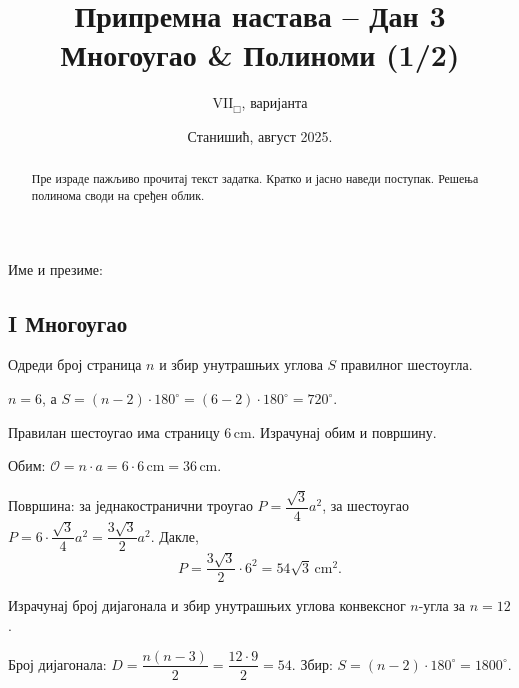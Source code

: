 \documentclass[10pt,a5paper,addpoints]{exam}
\title{Припремна настава – Дан 3\\ \small Многоугао \& Полиноми (1/2)}
\author{$\mathrm{VII}_\Box$, варијанта \variant{1}{2}{3}}
\date{Станишић, август 2025.}
\newcommand{\measure}[2]{#1\,\mathrm{#2}}
\def\variant#1#2#3{#1}
\begin{document}
\maketitle
\thispagestyle{headandfoot}

\noindent Име и презиме:\enspace\underline{\makebox[0.45\textwidth][s]{\hfill}}

\begin{flushleft}
\gradetable[h]
\end{flushleft}

\begin{abstract}
Пре израде пажљиво прочитај текст задатка. Кратко и јасно наведи поступак. Решења полинома своди на сређен облик.
\end{abstract}

\begin{questions}

\section*{I Многоугао}

\question[3]
Одреди број страница $n$ и збир унутрашњих углова $S$ правилног
\variant{шестоугла}{осмоугла}{десетоугла}.
\begin{solution}[\stretch 2]
$n=\variant{6}{8}{10}$, а $S=(n-2)\cdot 180^\circ
= (\variant{6}{8}{10}-2)\cdot 180^\circ
= \variant{720^\circ}{1080^\circ}{1440^\circ}$.
\end{solution}

\question[3]
Правилан \variant{шестоугао}{троугао}{шестоугао} има страницу
$\measure{\variant{6}{12}{4}}{cm}$.
Израчунај обим и површину.
\begin{solution}[\stretch 2]
Обим: $\mathcal{O}=n\cdot a=\variant{6}{3}{6}\cdot
\measure{\variant{6}{12}{4}}{cm}
= \measure{\variant{36}{36}{24}}{cm}$.

Површина: за једнакостранични троугао $P=\dfrac{\sqrt{3}}{4}a^2$,
за шестоугао $P=6\cdot\dfrac{\sqrt{3}}{4}a^2=\dfrac{3\sqrt{3}}{2}a^2$.
Дакле,
\[
P=\variant{
\dfrac{3\sqrt{3}}{2}\cdot 6^2
= 54\sqrt{3}\,\mathrm{cm}^2
}{
\dfrac{\sqrt{3}}{4}\cdot 12^2
= 36\sqrt{3}\,\mathrm{cm}^2
}{
\dfrac{3\sqrt{3}}{2}\cdot 4^2
= 24\sqrt{3}\,\mathrm{cm}^2
}.
\]
\end{solution}

\question[3]
Израчунај број дијагонала и збир унутрашњих углова конвексног
$n$-угла за \(n=\variant{12}{15}{10}\).
\begin{solution}[\stretch 2]
Број дијагонала: $D=\dfrac{n(n-3)}{2}
=\variant{\dfrac{12\cdot 9}{2}=54}{\dfrac{15\cdot 12}{2}=90}{\dfrac{10\cdot 7}{2}=35}$.
Збир: $S=(n-2)\cdot 180^\circ
=\variant{1800^\circ}{2340^\circ}{1440^\circ}$.
\end{solution}


\end{questions}
\end{document}
